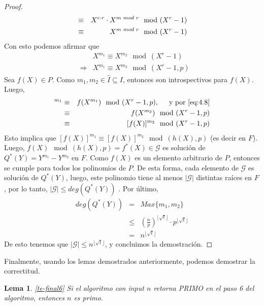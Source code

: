 \documentclass[10pt]{article}
\newcommand{\0}{\mathbf{0}}
\newcommand{\1}{\mathbf{1}}
\newcommand{\modulox}{\mod (X^r-1)}
\newcommand{\modulop}{\mod (X^r-1,p)}
\newcommand{\modulohp}{\mod (h(X),p)}
\newcommand{\+}{\oplus}
\newcommand{\comentario}[1]{}
\newtheorem{lemma}[theorem]{Lema}
\theoremstyle{remark}
\theoremstyle{remark}
\begin{document}
\begin{proof}
\begin{eqnarray}
			&\equiv & X^{c\cdot r}\cdot X^{m\hspace{0.1cm}mod\hspace{0.1cm} r}  \modulox \nonumber\\
			&\equiv & X^{m\hspace{0.1cm}mod\hspace{0.1cm} r}\modulox\nonumber
		\end{eqnarray}
		Con esto podemos afirmar que 
		\begin{eqnarray}
			& & X^{m_1}\equiv X^{m_2} \modulox\nonumber\\
			&\Rightarrow & X^{m_1}\equiv X^{m_2} \modulop\label{eq:4.8}
		\end{eqnarray}
		Sea $f(X)\in P$. Como $m_1,m_2\in \hat{I}\subseteq I$, entonces son introspectivos para $f(X)$. Luego,
		\begin{eqnarray}
			[f(X)]^{m_1} &\equiv & f(X^{m_1}) \modulop,\hspace{0.5cm}\text{y por }\eqref{eq:4.8}\nonumber\\
			&\equiv & f(X^{m_2}) \modulop\nonumber\\
			&\equiv &[f(X)]^{m_2} \modulop\nonumber		
		\end{eqnarray}
		Esto implica que $[f(X)]^{m_1}\equiv [f(X)]^{m_2}\modulohp$ (es decir en $F$). Luego, $f(X)\modulohp = f^*(X)\in \mathcal{G}$ es solución de $Q^*(Y)= Y^{m_1}-Y^{m_2}$ en $F$\comentario{OJO ACA DECIA DIRECTAMENTE QUE F(X) ESTABA EN $\mathcal{G}$ PERO CREO QUE NO ES ASI}. Como $f(X)$ es un elemento arbitrario de $P$, entonces se cumple para todos los polinomios de $P$. De esta forma, cada elemento de $\mathcal{G}$ es solución de $Q^*(Y)$, luego, este polinomio tiene al menos $|\mathcal{G}|$ distintas raí­ces en $F$, por lo tanto, $|\mathcal{G}|\leq deg(Q^*(Y))$ . Por último, 
		\begin{eqnarray}
			deg(Q^*(Y)) &=& Max\{m_1,m_2\}\nonumber\\
			&\leq& (\frac{n}{p})^{\lfloor \sqrt{t}\rfloor}\cdot p^{\lfloor \sqrt{t}\rfloor}\nonumber\\
			&=&n^{\lfloor \sqrt{t}\rfloor}\nonumber
		\end{eqnarray}
		De esto tenemos que $|\mathcal{G}|\leq n^{\lfloor \sqrt{t}\rfloor}$, y concluimos la demostración.
		
	\end{proof}
	Finalmente, usando los lemas demostrados anteriormente, podemos demostrar la correctitud.
	\begin{lemma}\ref{te-final6}
		Si el algoritmo con input $n$ retorna PRIMO en el paso 6 del algoritmo, entonces $n$ es primo.
	\end{lemma}
\end{document}
